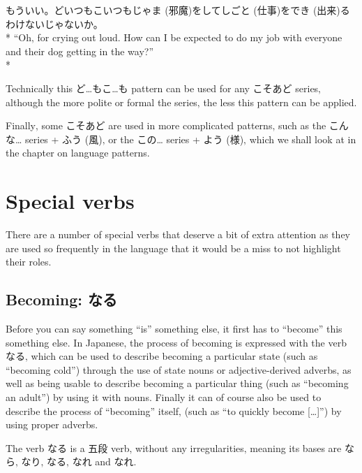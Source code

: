 \documentclass[11pt, b5paper, twoside, openright, onecolumn]{book}
\makeatletter
\newcommand*{\rubystack}[2]{{\relscale{0.5}%
  \begin{tabular}[b]{@{}c@{}}%
    {#1}\\%
   {\textscale{2}{#2}}%
  \end{tabular}}%
}
\DeclareRobustCommand*{\ruby}[2]{%
  \mbox{%
    \setlength{\parskip}{0ex}%
    \BeginAccSupp{method=pdfstringdef,ActualText={#1}}%
      \rubystack{\phantom{#2}}{#1}%
      \llap{%
        \rubystack{#2}{\phantom{#1}}%
      }%
    \EndAccSupp{}%
  }%
}
\renewcommand*{\ruby}[2]{#2 (#1)}%
\newenvironment{exampleblock}{
\setlength{\parindent}{0.6in}
\begin{minipage}[t]{\dimexpr\textwidth-\parindent}}
{\end{minipage}}
\makeatother
\begin{document}
\vspace{0.4cm}
\begin{exampleblock}
もういい。どいつもこいつも\ruby{邪魔}{じゃま}をして\ruby{仕事}{しごと}を\ruby{出来}{でき}るわけないじゃないか。 \\* 
“Oh‚ for crying out loud. How can I be expected to do my job with everyone and their dog getting in the way?” \\* 
\end{exampleblock}
\vspace{0.2cm}

Technically this ど…もこ…も pattern can be used for any こそあど series‚ although the more polite or formal the series‚ the less this pattern can be applied.

Finally‚ some こそあど are used in more complicated patterns‚ such as the こんな… series + \ruby{風}{ふう}‚ or the この… series + \ruby{様}{よう}‚ which we shall look at in the chapter on language patterns.

\section{Special verbs}

There are a number of special verbs that deserve a bit of extra attention as they are used so frequently in the language that it would be a miss to not highlight their roles.

\subsection{Becoming: なる}

Before you can say something “is” something else‚ it first has to “become” this something else. In Japanese‚ the process of becoming is expressed with the verb なる‚ which can be used to describe becoming a particular state (such as “becoming cold”) through the use of state nouns or adjective-derived adverbs‚ as well as being usable to describe becoming a particular thing (such as “becoming an adult”) by using it with nouns. Finally it can of course also be used to describe the process of “becoming” itself‚ (such as “to quickly become […]”) by using proper adverbs.

The verb なる is a 五段 verb‚ without any irregularities‚ meaning its bases are なら‚ なり‚ なる‚ なれ and なれ.
\end{document}
